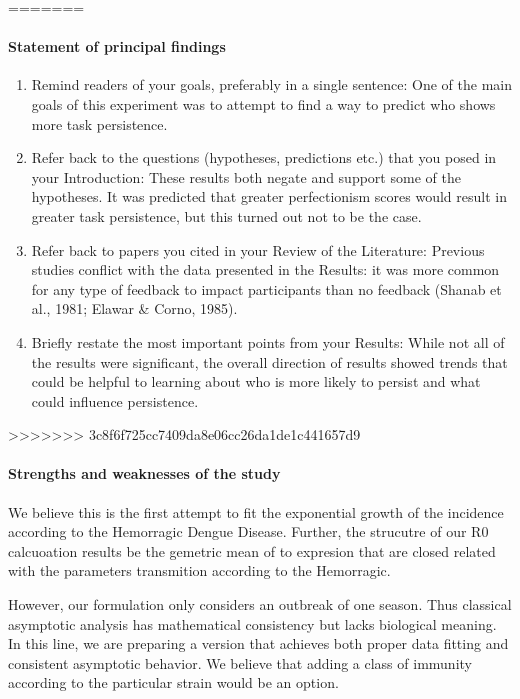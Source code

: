 =======
	\paragraph{Statement of principal findings}
	\begin{enumerate}
		\item
			Remind readers of your goals, preferably in a single sentence:
			One of the main goals of this experiment was to attempt
			 to find a way to predict who shows more task persistence.
		\item
			Refer back to the questions (hypotheses, predictions etc.) 
			that you posed in your Introduction:
				These results both negate and support some of the hypotheses.
				It was predicted that greater perfectionism scores would result
				in greater task persistence, but this turned out not to be
				the case.
		\item
			Refer back to papers you cited in your Review of the Literature:
			Previous studies conflict with the data presented in the Results: 
			it was more common for any type of feedback to impact participants 
			than no feedback (Shanab et al., 1981; Elawar \&  Corno, 1985).
		\item
			Briefly restate the most important points from your Results:
			While not all of the results were significant, 
			the overall direction of results showed trends 
			that could be helpful to learning about who is more 
			likely to persist and what could influence persistence.
	\end{enumerate}
>>>>>>> 3c8f6f725cc7409da8e06cc26da1de1c441657d9

    \paragraph{Strengths and weaknesses of the study}
        We believe this is the first attempt to fit the exponential 
    growth of the incidence according to the Hemorragic Dengue Disease. 
    Further, the strucutre of our R0 calcuoation results be 
    the gemetric mean of to expresion that are closed related 
    with the parameters transmition according to the Hemorragic.  

    
        However, our formulation only considers an outbreak of one season.
    Thus classical asymptotic analysis has mathematical consistency
    but lacks biological meaning.  In this line, we are preparing a
    version that achieves both \textemdash proper data fitting and consistent
    asymptotic behavior. We believe that adding a class of immunity
    according to the particular strain would be an option.

